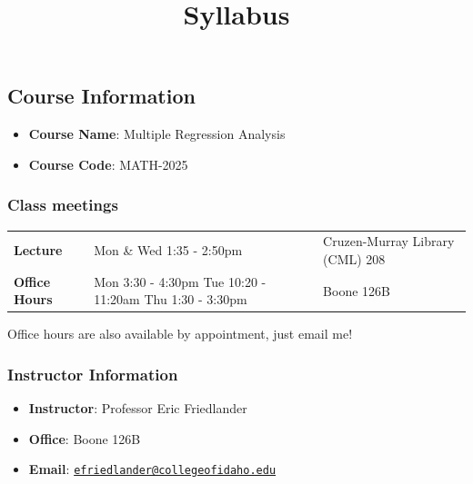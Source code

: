\documentclass[
  letterpaper,
  DIV=11,
  numbers=noendperiod]{scrartcl}
\title{Syllabus}
\author{}
\date{}
\providecommand{\tightlist}{%
  \setlength{\itemsep}{0pt}\setlength{\parskip}{0pt}}
\begin{document}
\maketitle


\subsection{Course Information}\label{course-information}

\begin{itemize}
\tightlist
\item
  \textbf{Course Name}: Multiple Regression Analysis
\item
  \textbf{Course Code}: MATH-2025
\end{itemize}

\subsubsection{Class meetings}\label{class-meetings}

\begin{longtable}[]{@{}
  >{\raggedright\arraybackslash}p{}
  >{\raggedright\arraybackslash}p{}
  >{\raggedright\arraybackslash}p{}@{}}
\toprule\noalign{}
\endhead
\bottomrule\noalign{}
\endlastfoot
\textbf{Lecture} & Mon \& Wed 1:35 - 2:50pm & Cruzen-Murray Library
(CML) 208 \\
\textbf{Office Hours} & Mon 3:30 - 4:30pm Tue 10:20 - 11:20am Thu 1:30 -
3:30pm & Boone 126B \\
\end{longtable}

Office hours are also available by appointment, just email me!

\subsubsection{Instructor Information}\label{instructor-information}

\begin{itemize}
\tightlist
\item
  \textbf{Instructor}: Professor Eric Friedlander
\item
  \textbf{Office}: Boone 126B
\item
  \textbf{Email}:
  \href{mailto:efriedlander@collegeofidaho.edu}{\nolinkurl{efriedlander@collegeofidaho.edu}}
\end{itemize}
\end{document}
